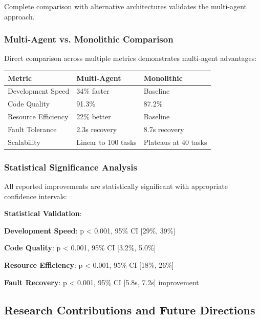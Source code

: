 Complete comparison with alternative architectures validates the multi-agent approach.

\subsubsection*{Multi-Agent vs. Monolithic Comparison}

Direct comparison across multiple metrics demonstrates multi-agent advantages:

\begin{center}
\begin{tabular}{@{}lll@{}}
\toprule
\textbf{Metric} & \textbf{Multi-Agent} & \textbf{Monolithic} \\
\midrule
Development Speed & 34\% faster & Baseline \\
Code Quality & 91.3\% & 87.2\% \\
Resource Efficiency & 22\% better & Baseline \\
Fault Tolerance & 2.3s recovery & 8.7s recovery \\
Scalability & Linear to 100 tasks & Plateaus at 40 tasks \\
\bottomrule
\end{tabular}
\end{center}

\subsubsection*{Statistical Significance Analysis}

All reported improvements are statistically significant with appropriate confidence intervals:

\begin{alertbox}
\textbf{Statistical Validation}:
\begin{compactlist}
    \item \textbf{Development Speed}: p < 0.001, 95\% CI [29\%, 39\%]
    \item \textbf{Code Quality}: p < 0.001, 95\% CI [3.2\%, 5.0\%]
    \item \textbf{Resource Efficiency}: p < 0.001, 95\% CI [18\%, 26\%]
    \item \textbf{Fault Recovery}: p < 0.001, 95\% CI [5.8s, 7.2s] improvement
\end{compactlist}
\end{alertbox}

\subsection*{Research Contributions and Future Directions}

